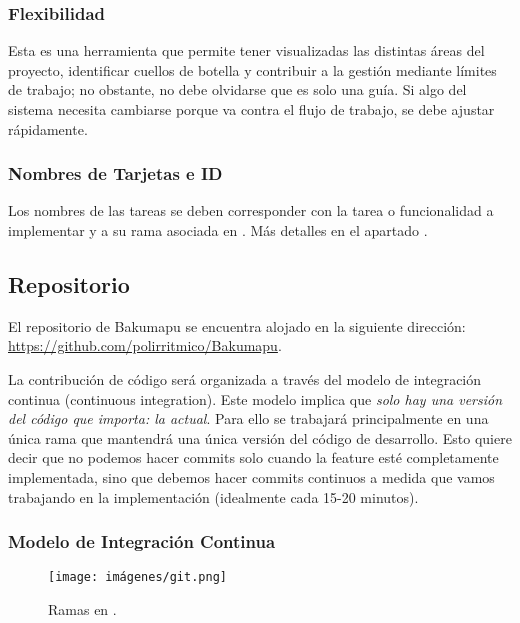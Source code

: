 \subsubsection{Flexibilidad}\label{flujo:flexibilidad}
Esta es una herramienta que permite tener visualizadas las distintas áreas del proyecto, identificar cuellos de botella y contribuir a la gestión mediante límites de trabajo; no obstante, no debe olvidarse que es solo una guía. Si algo del sistema necesita cambiarse porque va contra el flujo de trabajo, se debe ajustar rápidamente.

\subsubsection{Nombres de Tarjetas e ID}\label{flujo:nombres-de-tarjetas}
Los nombres de las tareas se deben corresponder con la tarea o funcionalidad a implementar y a su rama asociada en . Más detalles en el apartado .


\subsection{Repositorio}\label{flujo:repositorio}
El repositorio  de Bakumapu se encuentra alojado en la siguiente dirección: \url{https://github.com/polirritmico/Bakumapu}.

La contribución de código será organizada a través del modelo de integración continua (continuous integration). Este modelo implica que \emph{solo hay una versión del código que importa: la actual}. Para ello se trabajará principalmente en una única rama que mantendrá una única versión del código de desarrollo. Esto quiere decir que no podemos hacer commits solo cuando la feature esté completamente implementada, sino que debemos hacer commits continuos a medida que vamos trabajando en la implementación (idealmente cada 15-20 minutos).

\subsubsection{Modelo de Integración Continua}\label{flujo:modelo-de-ramas}
\begin{figure}[H]
	\centering
	\texttt{[image: imágenes/git.png]}
	\caption{Ramas en .}
\end{figure}

